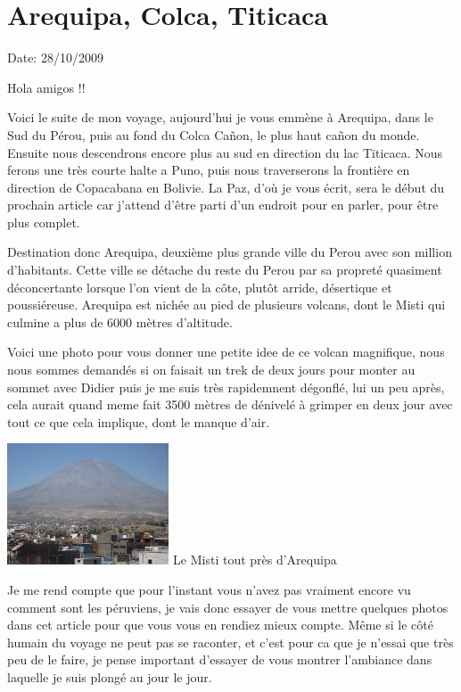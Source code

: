\section{Arequipa, Colca, Titicaca}

Date: 28/10/2009

\begin{multicols}{2}

Hola amigos !!

Voici le suite de mon voyage, aujourd'hui je vous emmène à Arequipa, dans le Sud du Pérou, puis au fond du Colca Cañon, le plus haut cañon du monde. Ensuite nous descendrons encore plus au sud en direction du lac Titicaca. Nous ferons une très courte halte a Puno, puis nous traverserons la frontière en direction de Copacabana en Bolivie. La Paz, d'où je vous écrit, sera le début du prochain article car j'attend d'être parti d'un endroit pour en parler, pour être plus complet.

Destination donc Arequipa, deuxième plus grande ville du Perou avec son million d'habitants. Cette ville se détache du reste du Perou par sa propreté quasiment déconcertante lorsque l'on vient de la côte, plutôt arride, désertique et poussiéreuse. Arequipa est nichée au pied de plusieurs volcans, dont le Misti qui culmine a plus de 6000 mètres d'altitude.

Voici une photo pour vous donner une petite idee de ce volcan magnifique, nous nous sommes demandés si on faisait un trek de deux jours pour monter au sommet avec Didier puis je me suis très rapidemnent dégonflé, lui un peu après, cela aurait quand meme fait 3500 mètres de dénivelé à grimper en deux jour avec tout ce que cela implique, dont le manque d'air.

\hspace*{-0.65cm}
\includegraphics[width=4.8cm]{articles/Arequipa-colca-titicaca/1256606928TSDk.jpg}
Le Misti tout près d'Arequipa

Je me rend compte que pour l'instant vous n'avez pas vraiment encore vu comment sont les péruviens, je vais donc essayer de vous mettre quelques photos dans cet article pour que vous vous en rendiez mieux compte. Même si le côté humain du voyage ne peut pas se raconter, et c'est pour ca que je n'essai que très peu de le faire, je pense important d'essayer de vous montrer l'ambiance dans laquelle je suis plongé au jour le jour.


\end{multicols}
